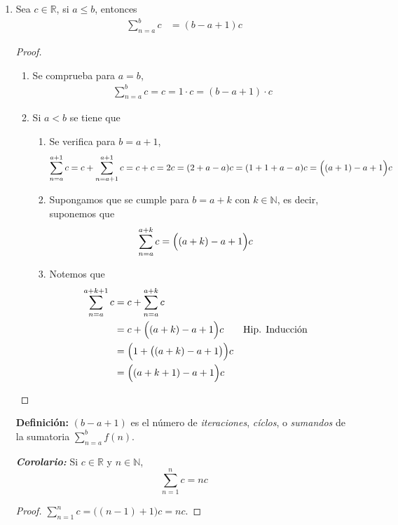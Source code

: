 \documentclass[11pt]{article}
\newcommand{\N}{\mathbb{N}}
\newcommand{\R}{\mathbb{R}}
\newcommand{\bfit}[1]{\textbf{\textit{#1}}}
\begin{document}
\begin{enumerate}[label=\alph*)]
  \item Sea $c\in \R$, si $a\leq b$, entonces \begin{align*}
    \sum_{n=a}^b c &= (b-a+1)c
  \end{align*}
  \begin{proof}\leavevmode
    \begin{enumerate}[label=\Roman*)]
      \item Se comprueba para $a=b$, \begin{align*}
        \sum_{n=a}^b c = c = 1\cdot c = (b-a+1)\cdot c
      \end{align*}
      \item Si $a<b$ se tiene que \begin{enumerate}[label=\roman*)]
        \item Se verifica para $b=a+1$, \begin{align*}
          \sum_{n=a}^{a+1} c &= c + \sum_{n=a+1}^{a+1} c = c + c = 2c = (2+a-a)c = (1+1+a-a)c = \Bigl((a+1)-a+1\Bigr) c
        \end{align*}
        \item Supongamos que se cumple para $b=a+k$ con $k\in \N$, es decir, suponemos que \begin{align*}
          \sum_{n=a}^{a+k} c &= \Bigl((a+k)-a+1\Bigr) c
        \end{align*}
        \item Notemos que \begin{align*}
          \sum_{n=a}^{a+k+1} c &= c + \sum_{n=a}^{a+k} c\\
          &= c + \Bigl((a+k)-a+1\Bigr) c && \text{Hip. Inducción}\\
          &= \Bigl(1 + \bigl((a+k)-a+1\bigr) \Bigr)c\\
          &= \Bigl((a+k+1)-a+1\Bigr)c
        \end{align*}
      \end{enumerate}
    \end{enumerate}
  \end{proof}

  \textbf{Definición:} $(b-a+1)$ es el número de \textit{iteraciones}, \textit{cíclos}, o \textit{sumandos} de la sumatoria $\sum_{n=a}^{b} f(n)$.

  \bfit{Corolario:} Si $c\in \R$ y $n\in \N$, \[\sum_{n=1}^n c = nc\]
  \begin{proof} $\sum_{n=1}^n c = \bigl((n-1)+1\bigr) c = nc$.
  \end{proof}


\end{enumerate}
\end{document}
